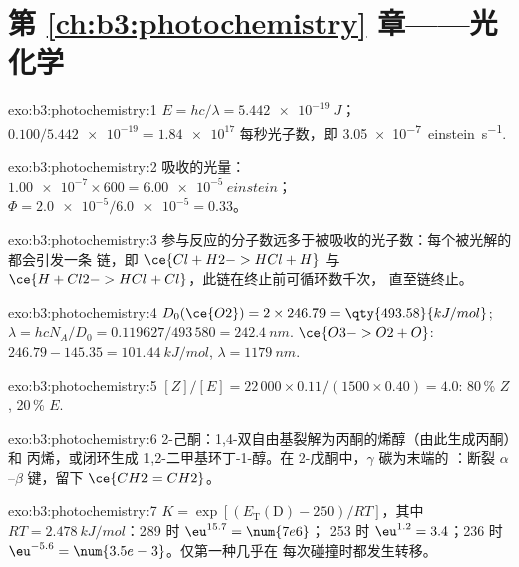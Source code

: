 \section*{第 \ref{ch:b3:photochemistry} 章——光化学}

\begin{solution}{exo:b3:photochemistry:1}
$E = hc/\lambda = \qty{5.442e-19}{J}$；$0.100/\num{5.442e-19} = \num{1.84e17}$ 每秒光子数，即
\qty{3.05e-7}{einstein.s^{-1}}.
\end{solution}

\begin{solution}{exo:b3:photochemistry:2}
吸收的光量：$\num{1.00e-7} \times 600 = \qty{6.00e-5}{einstein}$；$\Phi = \num{2.0e-5}/\num{6.0e-5} = 0.33$。
\end{solution}

\begin{solution}{exo:b3:photochemistry:3}
参与反应的分子数远多于被吸收的光子数：每个被光解的  都会引发一条
链，即 $\ce{Cl + H2 -> HCl + H}$ 与 $\ce{H + Cl2 -> HCl + Cl}$，此链在终止前可循环数千次，
直至链终止。
\end{solution}

\begin{solution}{exo:b3:photochemistry:4}
$D_0(\ce{O2}) = 2 \times 246.79 = \qty{493.58}{kJ/mol}$; $\lambda = hcN_A/D_0 = 0.119627/493\,580 =
\qty{242.4}{nm}$. $\ce{O3 -> O2 + O}$: $246.79 - 145.35 = \qty{101.44}{kJ/mol}$, $\lambda = \qty{1179}{nm}$.
\end{solution}

\begin{solution}{exo:b3:photochemistry:5}
$[Z]/[E] = 22\,000 \times 0.11/(1500 \times 0.40) = 4.0$: 80\,\% $Z$, 20\,\% $E$.
\end{solution}

\begin{solution}{exo:b3:photochemistry:6}
2-己酮：1,4-双自由基裂解为丙酮的烯醇（由此生成丙酮）和
丙烯，或闭环生成 1,2-二甲基环丁-1-醇。在 2-戊酮中，$\gamma$
碳为末端的 ：断裂 $\alpha$--$\beta$ 键，留下 $\ce{CH2=CH2}$。
\end{solution}

\begin{solution}{exo:b3:photochemistry:7}
$K = \exp[(E_{\mathrm T}(\mathrm D) - 250)/RT]$，其中 $RT = \qty{2.478}{kJ/mol}$：289 时 $\eu^{15.7} = \num{7e6}$；
253 时 $\eu^{1.2} = 3.4$；236 时 $\eu^{-5.6} = \num{3.5e-3}$。仅第一种几乎在
每次碰撞时都发生转移。
\end{solution}

